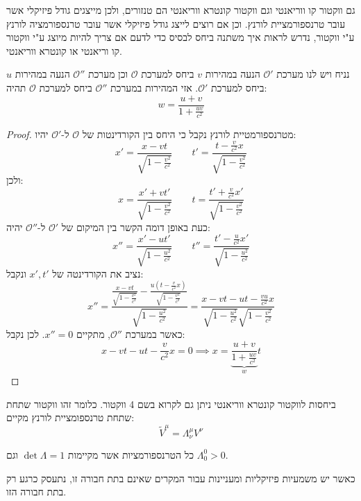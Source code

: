 \documentclass{tstextbook}
\begin{document}
\begin{remark}
גם ווקטור קו ווריאנטי וגם ווקטור קונטרא ווריאנטי הם טנזורים, ולכן מייצגים גודל פיזיקלי אשר עובר טרנספורמציית לורנץ. וכן אם רוצים לייצג גודל פיזיקלי אשר עובר טרנספורמציה לורנץ ע"י ווקטור, נדרש לראות איך משתנה ביחס לבסיס כדי לדעם אם צריך להיות מיוצג ע"י ווקטור קו וריאנטי או קונטרא ווריאנטי.

\end{remark}
\begin{proposition}
נניח ויש לנו מערכת \(\mathcal{O}'\) הנעה במהירות \(v\) ביחס למערכת \(\mathcal{O}\) וכן מערכת \(\mathcal{O''}\) הנעה במהירות \(u\) ביחס למערכת \(\mathcal{O'}\). אזי המהירות במערכת \(\mathcal{O''}\) ביחס למערכת \(\mathcal{O}\) תהיה:
$$w=\frac{u+v}{1+\frac{uv}{c^{2}}}$$

\end{proposition}
\begin{proof}
מטרנספורמטיית לורנץ נקבל כי היחס בין הקורדינטות של \(\mathcal{O}\) ל-\(\mathcal{O'}\) יהיו:
$$x'= \frac{x-vt}{\sqrt{ 1-\frac{v^2}{c^2} }}\qquad t'=\frac{t-\frac{v}{c^2}x}{\sqrt{ 1-\frac{v^2}{c^2} }}$$
ולכן:
$$x=\frac{x'+vt'}{\sqrt{ 1-\frac{v^2}{c^2} }}\qquad t = \frac{t'+\frac{v}{c^2}x'}{\sqrt{ 1-\frac{v^2}{c^2} }}$$
כעת באופן דומה הקשר בין המיקום של \(\mathcal{O'}\) ל-\(\mathcal{O''}\) יהיה:
$$x'' = \frac{x' - ut'}{\sqrt{ 1-\frac{u^2}{c^2} }}\qquad t'' = \frac{t' - \frac{u}{c^2}x'}{\sqrt{ 1-\frac{u^2}{c^2} }}$$
נציב את הקורדינטה של \(x',t'\) ונקבל:
$$x''  = \frac{\frac{x-vt}{\sqrt{ 1-\frac{v^2}{c^2} }}-\frac{u\left( t-\frac{v}{c^2}x \right)}{\sqrt{ 1-\frac{v^2}{c^2} }}}{\sqrt{ 1-\frac{u^2}{c^2} }}=\frac{x-vt - ut-\frac{vu}{c^2}x}{\sqrt{ 1-\frac{u^2}{c^2} }\sqrt{ 1-\frac{v^2}{c^2} }} $$
כאשר במערכת \(\mathcal{O''}\), מתקיים \(x'' =0\). לכן נקבל:
$$x-vt-ut-\frac{v}{c^2}x=0\implies x=\underbrace{ \frac{u+v}{1+\frac{uv}{c^2}} }_{ w }t$$

\end{proof}
\begin{definition}[4 ווקטור]
ביחסות לווקטור קונטרא ווריאנטי ניתן גם לקרוא בשם 4 ווקטור. כלומר זהו ווקטור שתחת שתחת טרנספומציית לורנץ מקיים:
$$\tilde{V}^\mu=\Lambda^\mu _{\nu}V^\nu$$

\end{definition}
\begin{definition}
כל הטרנספורמציות אשר מקיימות \(\det \Lambda=1\) וגם \(\Lambda_{0}^0>0\).

\end{definition}
כאשר יש משמעיות פיזיקליות ומעניינות עבור המקרים שאינם בתת חבורה זו, נתעסק כרגע רק בתת חבורה הזו.
\end{document}

